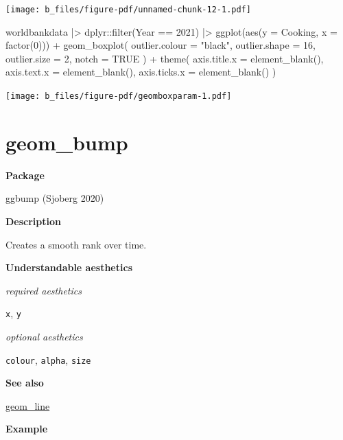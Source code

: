 \documentclass[
  letterpaper,
  DIV=11,
  numbers=noendperiod]{scrreprt}
\newenvironment{Shaded}{\begin{snugshade}}{\end{snugshade}}
\newcommand{\AttributeTok}[1]{\textcolor[rgb]{0.40,0.45,0.13}{#1}}
\newcommand{\ConstantTok}[1]{\textcolor[rgb]{0.56,0.35,0.01}{#1}}
\newcommand{\DecValTok}[1]{\textcolor[rgb]{0.68,0.00,0.00}{#1}}
\newcommand{\FunctionTok}[1]{\textcolor[rgb]{0.28,0.35,0.67}{#1}}
\newcommand{\NormalTok}[1]{\textcolor[rgb]{0.00,0.23,0.31}{#1}}
\newcommand{\SpecialCharTok}[1]{\textcolor[rgb]{0.37,0.37,0.37}{#1}}
\newcommand{\StringTok}[1]{\textcolor[rgb]{0.13,0.47,0.30}{#1}}
\begin{document}
\texttt{[image: b\_files/figure-pdf/unnamed-chunk-12-1.pdf]}

\begin{Shaded}
\begin{Highlighting}[]
\NormalTok{worldbankdata }\SpecialCharTok{|\textgreater{}}
\NormalTok{  dplyr}\SpecialCharTok{::}\FunctionTok{filter}\NormalTok{(Year }\SpecialCharTok{==} \DecValTok{2021}\NormalTok{) }\SpecialCharTok{|\textgreater{}}
  \FunctionTok{ggplot}\NormalTok{(}\FunctionTok{aes}\NormalTok{(}\AttributeTok{y =}\NormalTok{ Cooking, }\AttributeTok{x =} \FunctionTok{factor}\NormalTok{(}\DecValTok{0}\NormalTok{))) }\SpecialCharTok{+}
  \FunctionTok{geom\_boxplot}\NormalTok{(}
    \AttributeTok{outlier.colour =} \StringTok{"black"}\NormalTok{, }\AttributeTok{outlier.shape =} \DecValTok{16}\NormalTok{,}
    \AttributeTok{outlier.size =} \DecValTok{2}\NormalTok{, }\AttributeTok{notch =} \ConstantTok{TRUE}
\NormalTok{  ) }\SpecialCharTok{+}
  \FunctionTok{theme}\NormalTok{(}
    \AttributeTok{axis.title.x =} \FunctionTok{element\_blank}\NormalTok{(),}
    \AttributeTok{axis.text.x =} \FunctionTok{element\_blank}\NormalTok{(),}
    \AttributeTok{axis.ticks.x =} \FunctionTok{element\_blank}\NormalTok{()}
\NormalTok{  )}
\end{Highlighting}
\end{Shaded}

\texttt{[image: b\_files/figure-pdf/geomboxparam-1.pdf]}

\section{geom\_bump}\label{bump}

\textbf{Package}

ggbump (Sjoberg 2020)

\textbf{Description}

Creates a smooth rank over time.

\textbf{Understandable aesthetics}

\emph{required aesthetics}

\texttt{x}, \texttt{y}

\emph{optional aesthetics}

\texttt{colour}, \texttt{alpha}, \texttt{size}

\textbf{See also}

\hyperref[line]{geom\_line}

\textbf{Example}
\end{document}
